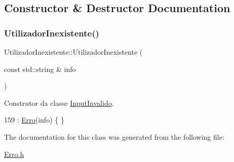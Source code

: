 \subsection{Constructor \& Destructor Documentation}
\mbox{\label{classUtilizadorInexistente_a66c90c46c5b2a33fa21fe40eb80cf2f8}} 
\subsubsection{\texorpdfstring{Utilizador\+Inexistente()}{UtilizadorInexistente()}}
{\footnotesize\ttfamily Utilizador\+Inexistente\+::\+Utilizador\+Inexistente (\begin{DoxyParamCaption}\item[{const std\+::string \&}]{info }\end{DoxyParamCaption})\hspace{0.3cm}{\ttfamily [inline]}}



Construtor da classe \hyperlink{classInputInvalido}{Input\+Invalido}. 


\begin{DoxyCode}
159 : \hyperlink{classErro_a15d79796bd17517ff05d45eee55556f1}{Erro}(info) \{ \}
\end{DoxyCode}


The documentation for this class was generated from the following file\+:\begin{DoxyCompactItemize}
\item 
\hyperlink{Erro_8h}{Erro.\+h}\end{DoxyCompactItemize}
